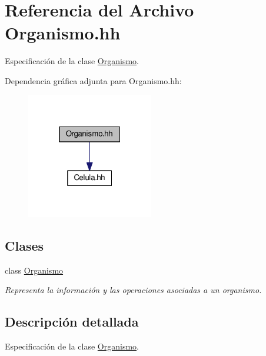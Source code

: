 \hypertarget{_organismo_8hh}{}\section{Referencia del Archivo Organismo.\+hh}
\label{_organismo_8hh}


Especificación de la clase \hyperlink{class_organismo}{Organismo}.  


Dependencia gráfica adjunta para Organismo.\+hh\+:\nopagebreak
\begin{figure}[H]
\begin{center}
\leavevmode
\includegraphics[width=157pt]{_organismo_8hh__incl}
\end{center}
\end{figure}
\subsection*{Clases}
\begin{DoxyCompactItemize}
\item 
class \hyperlink{class_organismo}{Organismo}
\begin{DoxyCompactList}\small\item\em Representa la información y las operaciones asociadas a un organismo. \end{DoxyCompactList}\end{DoxyCompactItemize}


\subsection{Descripción detallada}
Especificación de la clase \hyperlink{class_organismo}{Organismo}. 

